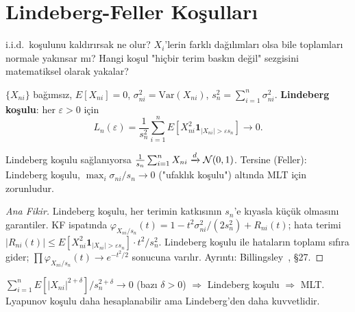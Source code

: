 \section{Lindeberg-Feller Koşulları}
\label{sec:lindeberg}

\begin{kesif}
i.i.d.\ koşulunu kaldırırsak ne olur? $X_i$'lerin farklı dağılımları olsa bile
toplamları normale yakınsar mı? Hangi koşul "hiçbir terim baskın değil"
sezgisini matematiksel olarak yakalar?
\end{kesif}

\begin{tanim}
\label{def:lindeberg}
$\{X_{ni}\}$ bağımsız, $E[X_{ni}] = 0$, $\sigma_{ni}^2 = \mathrm{Var}(X_{ni})$,
$s_n^2 = \sum_{i=1}^n \sigma_{ni}^2$. \textbf{Lindeberg koşulu}: her $\varepsilon > 0$ için
\[
  L_n(\varepsilon) = \frac{1}{s_n^2} \sum_{i=1}^n E\!\left[X_{ni}^2 \mathbf{1}_{|X_{ni}|>\varepsilon s_n}\right] \to 0.
\]
\end{tanim}

\begin{teorem}
\label{thm:lindeberg_feller}
Lindeberg koşulu sağlanıyorsa
$\frac{1}{s_n}\sum_{i=1}^n X_{ni} \xrightarrow{d} \mathcal{N}(0,1)$.
Tersine (Feller): Lindeberg koşulu, $\max_i \sigma_{ni}/s_n \to 0$ ("ufaklık koşulu")
altında MLT için zorunludur.
\end{teorem}

\begin{proof}[Ana Fikir]
Lindeberg koşulu, her terimin katkısının $s_n$'e kıyasla küçük olmasını garantiler.
KF ispatında $\varphi_{X_{ni}/s_n}(t) = 1 - t^2\sigma_{ni}^2/(2s_n^2) + R_{ni}(t)$;
hata terimi $|R_{ni}(t)| \leq E[X_{ni}^2\mathbf{1}_{|X_{ni}|>\varepsilon s_n}] \cdot t^2/s_n^2$.
Lindeberg koşulu ile hataların toplamı sıfıra gider;
$\prod \varphi_{X_{ni}/s_n}(t) \to e^{-t^2/2}$ sonucuna varılır.
Ayrıntı: Billingsley~\cite{Billingsley1995}, §27.
\end{proof}

\begin{onerme}
\label{prop:lyapunov}
$\sum_{i=1}^n E[|X_{ni}|^{2+\delta}] / s_n^{2+\delta} \to 0$ (bazı $\delta > 0$)
$\Rightarrow$ Lindeberg koşulu $\Rightarrow$ MLT.
Lyapunov koşulu daha hesaplanabilir ama Lindeberg'den daha kuvvetlidir.
\end{onerme}

